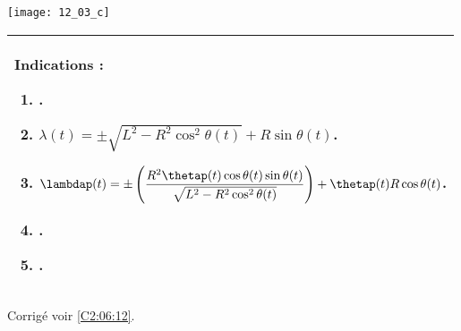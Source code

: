 \ifprof
\begin{center}
\texttt{[image: 12\_03\_c]}
\end{center}
\else
\fi



\ifprof
\else
\footnotesize
\ifcolle
\else
\begin{center}
\begin{tabular}{|p{.9\linewidth}|}
\hline
Indications :
\begin{enumerate}
\item .
\item $\lambda(t) = \pm\sqrt{L^2 - R^2\cos^2\theta(t)} + R\sin\theta(t) $.
\item $\lambdap(t) = \pm\left( \dfrac{R^2 \thetap(t) \cos\theta(t)\sin\theta(t)}{\sqrt{L^2 - R^2\cos^2\theta(t)}}\right) + \thetap(t)R\cos\theta(t)$.
\item .
\item .
\end{enumerate} \\ \hline
\end{tabular}
\end{center}
\fi
\normalsize
\begin{flushright}
\footnotesize{Corrigé  voir \ref{C2:06:12}.}
\end{flushright}%
\fi
